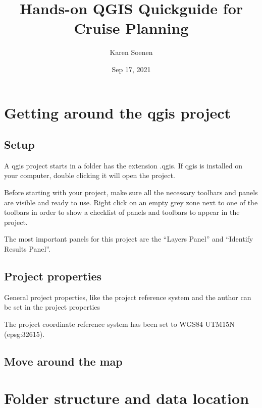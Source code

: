 \documentclass[letterpaper,10pt,english]{sphinxmanual}
\title{Hands-on QGIS Quickguide for Cruise Planning}
\date{Sep 17, 2021}
\author{Karen Soenen}
\begin{document}
\pagestyle{empty}
\sphinxmaketitle
\pagestyle{plain}
\sphinxtableofcontents
\pagestyle{normal}
\label{\detokenize{index::doc}}



\chapter{Getting around the qgis project}
\label{\detokenize{01_intro:getting-around-the-qgis-project}}\label{\detokenize{01_intro::doc}}

\section{Set\sphinxhyphen{}up}
\label{\detokenize{01_intro:set-up}}
\sphinxAtStartPar
A qgis project starts in a folder has the extension .qgis. If qgis is installed on your computer, double clicking it will open the project.



\sphinxAtStartPar
Before starting with your project, make sure all the necessary toolbars and panels are visible and ready to use. Right click on an empty grey zone next to one of the toolbars in order to show a checklist of panels and toolbars to appear in the project.

\sphinxAtStartPar
The most important panels for this project are the “Layers Panel” and “Identify Results Panel”.




\section{Project properties}
\label{\detokenize{01_intro:project-properties}}
\sphinxAtStartPar
General project properties, like the project reference system and the author can be set in the project properties



\sphinxAtStartPar
The project coordinate reference system has been set to WGS84 UTM15N (epsg:32615).


\section{Move around the map}
\label{\detokenize{01_intro:move-around-the-map}}



\chapter{Folder structure and data location}
\label{\detokenize{02_folder_hierarchy:folder-structure-and-data-location}}\label{\detokenize{02_folder_hierarchy::doc}}
\end{document}
